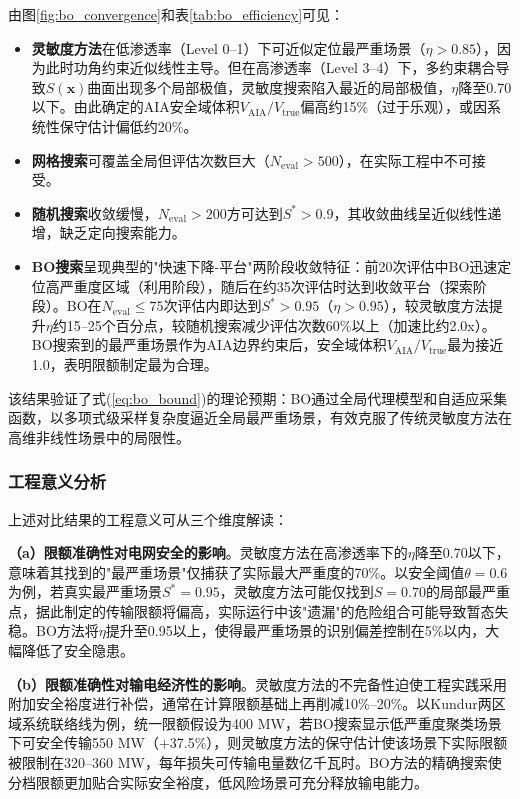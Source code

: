 \documentclass[a4paper,11pt]{ctexart}
\newcommand{\bx}{\mathbf{x}}
\begin{document}
由图\ref{fig:bo_convergence}和表\ref{tab:bo_efficiency}可见：
\begin{itemize}
    \item \textbf{灵敏度方法}在低渗透率（Level 0--1）下可近似定位最严重场景（$\eta > 0.85$），因为此时功角约束近似线性主导。但在高渗透率（Level 3--4）下，多约束耦合导致$S(\bx)$曲面出现多个局部极值，灵敏度搜索陷入最近的局部极值，$\eta$降至0.70以下。由此确定的AIA安全域体积$V_{\text{AIA}} / V_{\text{true}}$偏高约15\%（过于乐观），或因系统性保守估计偏低约20\%。
    \item \textbf{网格搜索}可覆盖全局但评估次数巨大（$N_{\text{eval}} > 500$），在实际工程中不可接受。
    \item \textbf{随机搜索}收敛缓慢，$N_{\text{eval}} > 200$方可达到$S^* > 0.9$，其收敛曲线呈近似线性递增，缺乏定向搜索能力。
    \item \textbf{BO搜索}呈现典型的"快速下降-平台"两阶段收敛特征：前20次评估中BO迅速定位高严重度区域（利用阶段），随后在约35次评估时达到收敛平台（探索阶段）。BO在$N_{\text{eval}} \leq 75$次评估内即达到$S^* > 0.95$（$\eta > 0.95$），较灵敏度方法提升$\eta$约15--25个百分点，较随机搜索减少评估次数60\%以上（加速比约2.0x）。BO搜索到的最严重场景作为AIA边界约束后，安全域体积$V_{\text{AIA}} / V_{\text{true}}$最为接近1.0，表明限额制定最为合理。
\end{itemize}

该结果验证了式(\ref{eq:bo_bound})的理论预期：BO通过全局代理模型和自适应采集函数，以多项式级采样复杂度逼近全局最严重场景，有效克服了传统灵敏度方法在高维非线性场景中的局限性。

\subsubsection{工程意义分析}

上述对比结果的工程意义可从三个维度解读：

\textbf{（a）限额准确性对电网安全的影响}。灵敏度方法在高渗透率下的$\eta$降至0.70以下，意味着其找到的"最严重场景"仅捕获了实际最大严重度的70\%。以安全阈值$\theta = 0.6$为例，若真实最严重场景$S^* = 0.95$，灵敏度方法可能仅找到$S = 0.70$的局部最严重点，据此制定的传输限额将偏高，实际运行中该"遗漏"的危险组合可能导致暂态失稳。BO方法将$\eta$提升至0.95以上，使得最严重场景的识别偏差控制在5\%以内，大幅降低了安全隐患。

\textbf{（b）限额准确性对输电经济性的影响}。灵敏度方法的不完备性迫使工程实践采用附加安全裕度进行补偿，通常在计算限额基础上再削减10\%--20\%。以Kundur两区域系统联络线为例，统一限额假设为400 MW，若BO搜索显示低严重度聚类场景下可安全传输550 MW（+37.5\%），则灵敏度方法的保守估计使该场景下实际限额被限制在320--360 MW，每年损失可传输电量数亿千瓦时。BO方法的精确搜索使分档限额更加贴合实际安全裕度，低风险场景可充分释放输电能力。
\end{document}
